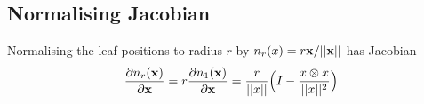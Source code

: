 \documentclass[11pt]{article}
\newcommand{\be}{\begin{equation*}}
\newcommand{\ee}{\end{equation*}}
\newcommand{\bee}{\begin{eqnarray*}}
\newcommand{\eee}{\end{eqnarray*}}
\begin{document}

\subsection{Normalising Jacobian}
Normalising the leaf positions to radius $r$ by $n_{r}(x) = r \bold{x}/||\bold{x}||$ has Jacobian
\be
\frac{\partial n_{r}(\bold{x})}{\partial \bold{x}} = r \frac{\partial n_{1}(\bold{x})}{\partial \bold{x}} = 
\dfrac{r}{||x||} \Big( I - \dfrac{x \otimes x}{||x||^{2}} \Big)
\ee


%
%


\nocite{*}


\end{document}
